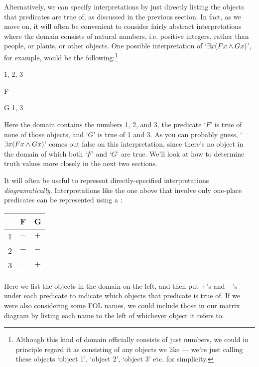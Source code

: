 Alternatively, we can specify interpretations by just directly listing the objects that predicates are true of,  as discussed in the previous section.  In fact, as we move on, it will often be convenient to consider fairly abstract interpretations where the domain consists of natural numbers, i.e. positive integers, rather than people, or plants, or other objects. One possible interpretation of `$\exists x(Fx \wedge Gx)$', for example, would be the following:\footnote{Although this kind of domain officially consists of just numbers,  we could in principle regard it as consisting of any objects we like --- we're just calling these objects `object 1', `object 2', `object 3' etc. for simplicity.}
	\begin{ekey}
		\item[\text{Domain}] 1, 2, 3
		\item[F]
		\item[G] 1, 3
	\end{ekey}
Here the domain contains the numbers 1, 2, and 3, the predicate `$F$' is true of none of those objects, and `$G$' is true of 1 and 3.  As you can probably guess, `$\exists x(Fx \wedge Gx)$' comes out false on this interpretation, since there's no object in the domain of which both `$F$' and `$G$' are true.  We'll look at how to determine truth values more closely in the next two sections.

It will  often be useful to represent directly-specified interpretations \emph{diagramatically}.  Interpretations like the one above that involve only one-place predicates can be represented using a :
\begin{center}\begin{tabular}{|c|c|c|}
\hline
    &   F   &   G   \\ \hline
1   &   $-$   &   $+$   \\ \hline
2   &   $-$   &   $-$ \\ \hline
3   &   $-$   &   $+$ \\ \hline
\end{tabular}\end{center}
Here we list the objects in the domain on the left, and then put $+$'s and $-$'s under each predicate to indicate which objects that predicate is true of.  If we were also considering some FOL names, we could include those in our matrix diagram by listing each name to the left of whichever object it refers to.

